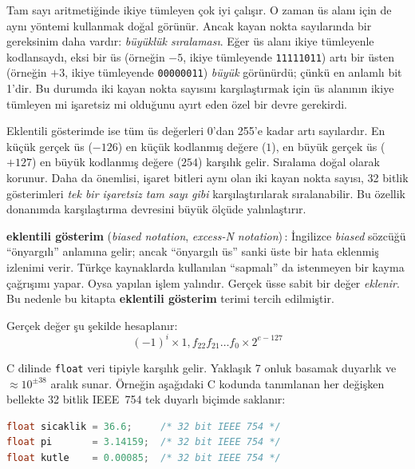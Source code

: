 \begin{bilginot}
Tam sayı aritmetiğinde ikiye tümleyen çok iyi çalışır. O zaman üs alanı için de aynı yöntemi kullanmak doğal görünür. Ancak kayan nokta sayılarında bir gereksinim daha vardır: \emph{büyüklük sıralaması}. Eğer üs alanı ikiye tümleyenle kodlansaydı, eksi bir üs (örneğin $-5$, ikiye tümleyende \texttt{11111011}) artı bir üsten (örneğin $+3$, ikiye tümleyende \texttt{00000011}) \emph{büyük} görünürdü; çünkü en anlamlı bit 1'dir. Bu durumda iki kayan nokta sayısını karşılaştırmak için üs alanının ikiye tümleyen mi işaretsiz mi olduğunu ayırt eden özel bir devre gerekirdi.

Eklentili gösterimde ise tüm üs değerleri 0'dan 255'e kadar artı sayılardır. En küçük gerçek üs ($-126$) en küçük kodlanmış değere ($1$), en büyük gerçek üs ($+127$) en büyük kodlanmış değere ($254$) karşılık gelir. Sıralama doğal olarak korunur. Daha da önemlisi, işaret bitleri aynı olan iki kayan nokta sayısı, 32 bitlik gösterimleri \emph{tek bir işaretsiz tam sayı gibi} karşılaştırılarak sıralanabilir. Bu özellik donanımda karşılaştırma devresini büyük ölçüde yalınlaştırır.

\end{bilginot}

\begin{terimnotu}
\textbf{eklentili gösterim} (\emph{biased notation}, \emph{excess-N notation})\,: İngilizce \emph{biased} sözcüğü ``önyargılı'' anlamına gelir; ancak ``önyargılı üs'' sanki üste bir hata eklenmiş izlenimi verir. Türkçe kaynaklarda kullanılan ``sapmalı'' da istenmeyen bir kayma çağrışımı yapar. Oysa yapılan işlem yalındır. Gerçek üsse sabit bir değer \emph{eklenir}. Bu nedenle bu kitapta \textbf{eklentili gösterim} terimi tercih edilmiştir.
\end{terimnotu}

Gerçek değer şu şekilde hesaplanır:
\[
  (-1)^{i} \times 1{,}f_{22}f_{21}\ldots f_0 \times 2^{e - 127}
\]

C dilinde \texttt{float} veri tipiyle karşılık gelir. Yaklaşık 7 onluk basamak duyarlık ve $\approx 10^{\pm 38}$ aralık sunar. Örneğin aşağıdaki C kodunda tanımlanan her değişken bellekte 32 bitlik IEEE~754 tek duyarlı biçimde saklanır:

\begin{lstlisting}[language=C, xleftmargin=2em]
float sicaklik = 36.6;     /* 32 bit IEEE 754 */
float pi       = 3.14159;  /* 32 bit IEEE 754 */
float kutle    = 0.00085;  /* 32 bit IEEE 754 */
\end{lstlisting}

